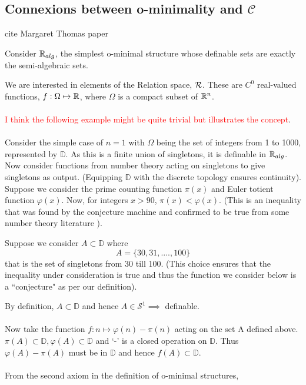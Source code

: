 % 
\subsection{Connexions between o-minimality and \texorpdfstring{$\mathcal{C}$}{C}}

cite Margaret Thomas paper \cite{thomasConvergenceResultsFunction2012}

% 

Consider $\mathbb{R}_{alg}$, the simplest o-minimal structure whose definable sets are exactly the semi-algebraic sets.

We are interested in elements of the Relation space, $\mathcal{R}$.
These are $C^0$ real-valued functions, $f:\Omega\mapsto\mathbb{R}$, where $\Omega$ is a compact subset of $\mathbb{R}^n$.
\\\\
\textcolor{red}{I think the following example might be quite trivial but illustrates the concept}.
\\\\
Consider the simple case of $n=1$ with $\Omega$ being the set of integers from 1 to 1000, represented by $\mathbb{D}$.
As this is a finite union of singletons, it is definable in $\mathbb{R}_{alg}$. Now consider functions from number theory acting on singletons to give singletons as output. (Equipping $\mathbb{D}$ with the discrete topology ensures continuity). Suppose we consider the prime counting function $\pi(x)$ and Euler totient function $\varphi(x)$. Now, for integers $x > 90$, $\pi(x) < \varphi(x)$. (This is an inequality that was found by the conjecture machine and confirmed to be true from some number theory literature \cite{moser1951}).

Suppose we consider $A\subset\mathbb{D}$ where
\begin{equation*}
    A = \{30, 31,....,100\}
\end{equation*}
that is the set of singletons from 30 till 100. (This choice ensures that the inequality under consideration is true and thus the function we consider below is a ``conjecture" as per our definition).

By definition, $A\subset\mathbb{D}$ and hence $A\in\mathcal{S}^1 \implies $ definable.
\\\\
Now take the function $f: n\mapsto\varphi(n) - \pi(n)$ acting on the set A defined above. $\pi(A)\subset\mathbb{D}, \varphi(A)\subset\mathbb{D}$ and `-' is a closed operation on $\mathbb{D}$. Thus $\varphi(A) - \pi(A)$ must be in $\mathbb{D}$ and hence $f(A)\subset\mathbb{D}$.
\\\\
From the second axiom in the definition of o-minimal structures,

